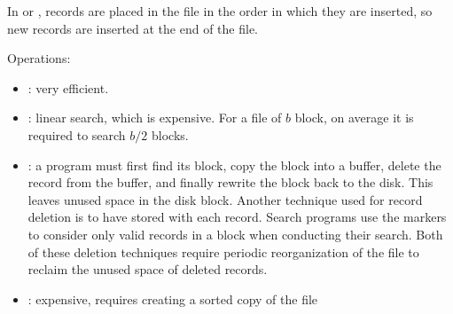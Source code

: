   \par In  or , records are placed in the file in the order in which they are inserted, so new records are inserted at the end of the file.
  \par Operations:
  \begin{itemize}
    \item {}: very efficient.
    \item {}: linear search, which is expensive. For a file of $b$ block, on average it is required to search $b / 2$ blocks.
    \item {}: a program must first find its block, copy the block into a buffer, delete the record from the buffer, and finally rewrite the block back to the disk. This leaves unused space in the disk block. Another technique used for record deletion is to have  stored with each record. Search programs use the markers to consider only valid records in a block when conducting their search. Both of these deletion techniques require periodic reorganization of the file to reclaim the unused space of deleted records.
    \item {}: expensive, requires creating a sorted copy of the file
  \end{itemize}


